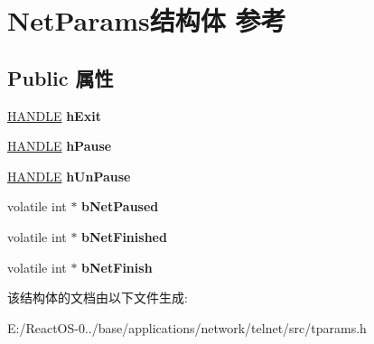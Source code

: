 \hypertarget{struct_net_params}{}\section{Net\+Params结构体 参考}
\label{struct_net_params}
\subsection*{Public 属性}
\begin{DoxyCompactItemize}
\item 
\mbox{\label{struct_net_params_aa07efa24b9bae393f7399d047074697a}} 
\hyperlink{interfacevoid}{H\+A\+N\+D\+LE} {\bfseries h\+Exit}
\item 
\mbox{\label{struct_net_params_ae9cdf7a58f7dee2ba56c16f2e1437dbc}} 
\hyperlink{interfacevoid}{H\+A\+N\+D\+LE} {\bfseries h\+Pause}
\item 
\mbox{\label{struct_net_params_afda5aa5e85fc0b7aea725072d722717e}} 
\hyperlink{interfacevoid}{H\+A\+N\+D\+LE} {\bfseries h\+Un\+Pause}
\item 
\mbox{\label{struct_net_params_a7cc98dc63da8979e8df29576005e1185}} 
volatile int $\ast$ {\bfseries b\+Net\+Paused}
\item 
\mbox{\label{struct_net_params_aefe9467d248ce3fd53d32b6264315d38}} 
volatile int $\ast$ {\bfseries b\+Net\+Finished}
\item 
\mbox{\label{struct_net_params_aa4d54753f7157218355c3d5d60cc6fe5}} 
volatile int $\ast$ {\bfseries b\+Net\+Finish}
\end{DoxyCompactItemize}


该结构体的文档由以下文件生成\+:\begin{DoxyCompactItemize}
\item 
E\+:/\+React\+O\+S-\/0../base/applications/network/telnet/src/tparams.\+h\end{DoxyCompactItemize}
